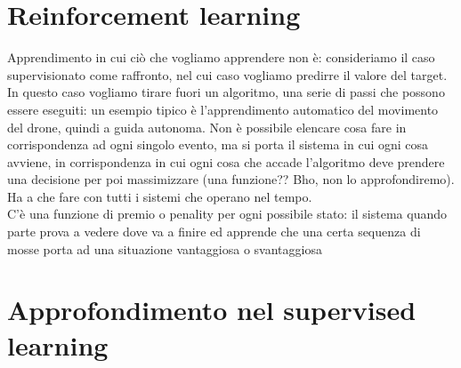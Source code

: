 \documentclass[12pt, oneside]{extbook}
\begin{document}
\section{Reinforcement learning}
Apprendimento in cui ciò che vogliamo apprendere non è: consideriamo il caso supervisionato come raffronto, nel cui caso vogliamo predirre il valore del target.\\In questo caso vogliamo tirare fuori un algoritmo, una serie di passi che possono essere eseguiti: un esempio tipico è l'apprendimento automatico del movimento del drone, quindi a guida autonoma. Non è possibile elencare cosa fare in corrispondenza ad ogni singolo evento, ma si porta il sistema in cui ogni cosa avviene, in corrispondenza in cui ogni cosa che accade l'algoritmo deve prendere una decisione per poi massimizzare (una funzione?? Bho, non lo approfondiremo).\\Ha a che fare con tutti i sistemi che operano nel tempo.\\C'è una funzione di premio o penality per ogni possibile stato: il sistema quando parte prova a vedere dove va a finire ed apprende che una certa sequenza di mosse porta ad una situazione vantaggiosa o svantaggiosa

\section{Approfondimento nel supervised learning}
\end{document}
